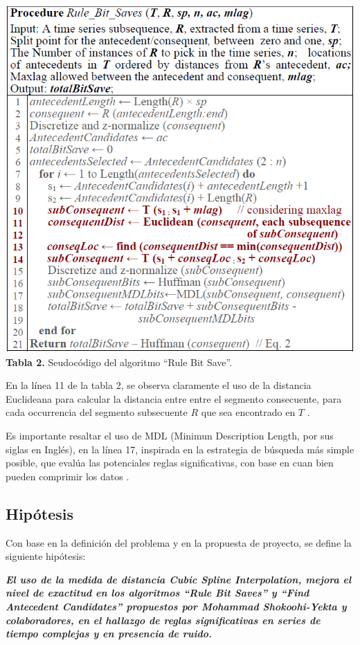 \begin{center}
\includegraphics[scale=0.7]{rulebitsaves.png}\\
\vspace*{10pt}
\footnotesize{\textbf{Tabla 2.} Seudoc\'odigo del algoritmo \enquote{Rule Bit Save}.}
\end{center}
En la l\'inea 11 de la tabla 2, se observa claramente el uso de la distancia Euclideana para calcular la distancia entre entre el segmento consecuente, para cada occurrencia del segmento subsecuente $R$ que sea encontrado en $T$  \cite{main}.\par
Es importante resaltar el uso de MDL (Minimun Description Length, por sus siglas en Ingl\'es), en la l\'inea 17, inspirada en la estrategia de b\'usqueda m\'as simple posible, que eval\'ua las potenciales reglas significativas, con base en cuan bien pueden comprimir los datos \cite{main}.
\subsection{Hip\'otesis}
Con base en la definici\'on del problema y en la propuesta de proyecto, se define la siguiente hip\'otesis:\par
\textbf{\textit{El uso de la medida de distancia \textit{Cubic Spline Interpolation}, mejora el nivel de exactitud en los algoritmos \textit{\textbf{\enquote{Rule Bit Saves}}} y \textit{\textbf{\enquote{Find Antecedent Candidates}}} propuestos por Mohammad Shokoohi-Yekta y colaboradores, en el hallazgo de reglas significativas en series de tiempo complejas y en presencia de ruido.}} 
